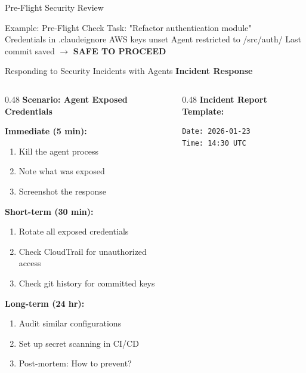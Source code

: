 \documentclass[aspectratio=169,11pt]{beamer}
\begin{document}
\begin{frame}{Pre-Flight Security Review}
    \vspace{0.4cm}
    \begin{exampleblock}{Example: Pre-Flight Check}
        Task: "Refactor authentication module"\\
        \checkmark{} Credentials in .claudeignore \checkmark{} AWS keys unset \checkmark{} Agent restricted to /src/auth/ \checkmark{} Last commit saved $\rightarrow$ \textbf{SAFE TO PROCEED}
    \end{exampleblock}
\end{frame}

\begin{frame}[fragile]{Responding to Security Incidents with Agents}
    \textbf{Incident Response}

    \begin{columns}[T]
        \begin{column}{0.48\textwidth}
            \textbf{Scenario: Agent Exposed Credentials}

            \textbf{Immediate (5 min):}
            \begin{enumerate}
                \item Kill the agent process
                \item Note what was exposed
                \item Screenshot the response
            \end{enumerate}

            \textbf{Short-term (30 min):}
            \begin{enumerate}
                \item Rotate all exposed credentials
                \item Check CloudTrail for unauthorized access
                \item Check git history for committed keys
            \end{enumerate}

            \textbf{Long-term (24 hr):}
            \begin{enumerate}
                \item Audit similar configurations
                \item Set up secret scanning in CI/CD
                \item Post-mortem: How to prevent?
            \end{enumerate}
        \end{column}
        \begin{column}{0.48\textwidth}
            \textbf{Incident Report Template:}
            \begin{lstlisting}[language=Bash]
Date: 2026-01-23
Time: 14:30 UTC


\end{lstlisting}
\end{column}
\end{columns}
\end{frame}
\end{document}
